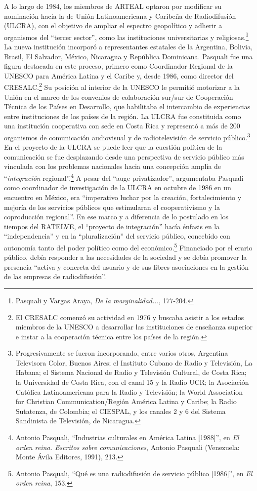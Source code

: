 \documentclass{tufte-handout}
\begin{document}
A lo largo de 1984, los miembros de ARTEAL optaron por modificar su
nominación hacia la de Unión Latinoamericana y Caribeña de Radiodifusión
(ULCRA), con el objetivo de ampliar el espectro geopolítico y adherir a
organismos del ``tercer sector'', como las instituciones universitarias
y religiosas.\footnote{Pasquali y Vargas Araya, \emph{De la
  marginalidad...}, 177-204.} La nueva institución incorporó a
representantes estatales de la Argentina, Bolivia, Brasil, El Salvador,
México, Nicaragua y República Dominicana. Pasquali fue una figura
destacada en este proceso, primero como Coordinador Regional de la
UNESCO para América Latina y el Caribe y, desde 1986, como director del
CRESALC.\footnote{El CRESALC comenzó su actividad en 1976 y buscaba
  asistir a los estados miembros de la UNESCO a desarrollar las
  instituciones de enseñanza superior e instar a la cooperación técnica
  entre los países de la región.} Su posición al interior de la UNESCO
le permitió motorizar a la Unión en el marco de los convenios de
colaboración sur/sur de Cooperación Técnica de los Países en Desarrollo,
que habilitaba el intercambio de experiencias entre instituciones de los
países de la región. La ULCRA fue constituida como una institución
cooperativa con sede en Costa Rica y representó a más de 200 organismos
de comunicación audiovisual y de radiotelevisión de servicio
público.\footnote{Progresivamente se fueron incorporando, entre varios
  otros, Argentina Televisora Color, Buenos Aires; el Instituto Cubano
  de Radio y Televisión, La Habana; el Sistema Nacional de Radio y
  Televisión Cultural, de Costa Rica; la Universidad de Costa Rica, con
  el canal 15 y la Radio UCR; la Asociación Católica Latinoamericana
  para la Radio y Televisión; la World Association for Christian
  Communication/Región América Latina y Caribe; la Radio Sutatenza, de
  Colombia; el CIESPAL, y los canales 2 y 6 del Sistema Sandinista de
  Televisión, de Nicaragua.} En el proyecto de la ULCRA se puede leer
que la cuestión política de la comunicación se fue desplazando desde una
perspectiva de servicio público más vinculada con los problemas
nacionales hacia una concepción amplia de ``\emph{integración}
regional''.\footnote{Antonio Pasquali, ``Industrias culturales en
  América Latina {[}1988{]}'', en \emph{El orden reina. Escritos sobre
  comunicaciones}, Antonio Pasquali (Venezuela: Monte Ávila Editores,
  1991), 213.} A pesar del ``auge privatizador'', argumentaba Pasquali
como coordinador de investigación de la ULCRA en octubre de 1986 en un
encuentro en México, era ``imperativo luchar por la creación,
fortalecimiento y mejoría de los servicios públicos que estimularan el
cooperativismo y la coproducción regional''. En ese marco y a diferencia
de lo postulado en los tiempos del RATELVE, el ``proyecto de
integración'' hacía énfasis en la ``independencia'' y en la
``pluralización'' del servicio público, concebido con autonomía tanto
del poder político como del económico.\footnote{Antonio Pasquali, ``Qué
  es una radiodifusión de servicio público {[}1986{]}'', en \emph{El
  orden reina}, 153.} Financiado por el erario público, debía responder
a las necesidades de la sociedad y se debía promover la presencia
``activa y concreta del usuario y de sus libres asociaciones en la
gestión de las empresas de radiodifusión''.
\end{document}
